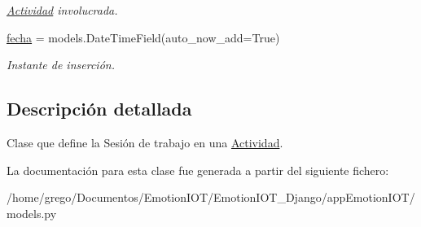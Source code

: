\begin{DoxyCompactItemize}
\begin{DoxyCompactList}\small\item\em \hyperlink{classappEmotionIOT_1_1models_1_1Actividad}{Actividad} involucrada. \end{DoxyCompactList}\item 
\hyperlink{classappEmotionIOT_1_1models_1_1Sesion_ac31ee92db7c2623708c94b46c1282e5d}{fecha} = models.\+Date\+Time\+Field(auto\+\_\+now\+\_\+add=True)\hypertarget{classappEmotionIOT_1_1models_1_1Sesion_ac31ee92db7c2623708c94b46c1282e5d}{}\label{classappEmotionIOT_1_1models_1_1Sesion_ac31ee92db7c2623708c94b46c1282e5d}

\begin{DoxyCompactList}\small\item\em Instante de inserción. \end{DoxyCompactList}\end{DoxyCompactItemize}


\subsection{Descripción detallada}
Clase que define la Sesión de trabajo en una \hyperlink{classappEmotionIOT_1_1models_1_1Actividad}{Actividad}. 

La documentación para esta clase fue generada a partir del siguiente fichero\+:\begin{DoxyCompactItemize}
\item 
/home/grego/\+Documentos/\+Emotion\+I\+O\+T/\+Emotion\+I\+O\+T\+\_\+\+Django/app\+Emotion\+I\+O\+T/models.\+py\end{DoxyCompactItemize}
